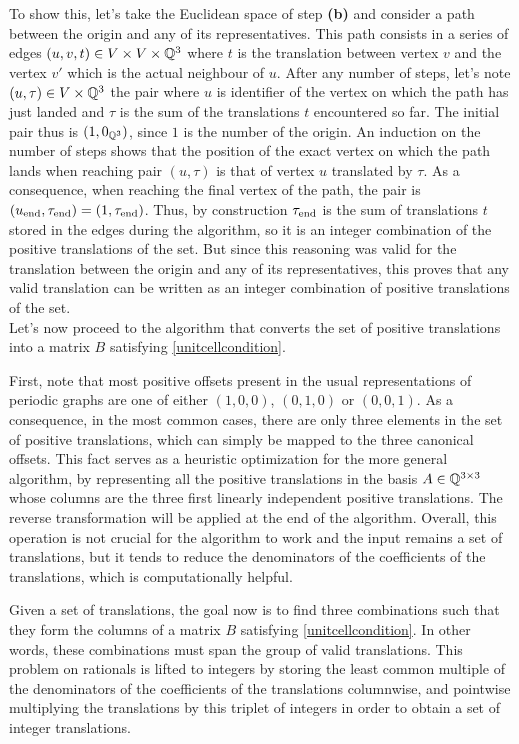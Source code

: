 \documentclass[main.tex]{subfiles}
\begin{document}
To show this, let's take the Euclidean space of step {\sffamily\small\bfseries(b)} and consider a path between the origin and any of its representatives. This path consists in a series of edges $(u,v,t)\in V\times V\times\mathbb{Q}^3$ where $t$ is the translation between vertex $v$ and the vertex $v'$ which is the actual neighbour of $u$. After any number of steps, let's note $(u,\tau)\in V\times\mathbb{Q}^3$ the pair where $u$ is identifier of the vertex on which the path has just landed and $\tau$ is the sum of the translations $t$ encountered so far. The initial pair thus is $(1,0_{\mathbb{Q}^3})$, since $1$ is the number of the origin. An induction on the number of steps shows that the position of the exact vertex on which the path lands when reaching pair $(u,\tau)$ is that of vertex $u$ translated by $\tau$. As a consequence, when reaching the final vertex of the path, the pair is $(u_\text{end},\tau_\text{end}) = (1,\tau_\text{end})$. Thus, by construction $\tau_\text{end}$ is the sum of translations $t$ stored in the edges during the algorithm, so it is an integer combination of the positive translations of the set. But since this reasoning was valid for the translation between the origin and any of its representatives, this proves that any valid translation can be written as an integer combination of positive translations of the set.\\

Let's now proceed to the algorithm that converts the set of positive translations into a matrix $B$ satisfying \cref{unitcellcondition}.

First, note that most positive offsets present in the usual representations of periodic graphs are one of either $(1,0,0)$, $(0,1,0)$ or $(0,0,1)$. As a consequence, in the most common cases, there are only three elements in the set of positive translations, which can simply be mapped to the three canonical offsets. This fact serves as a heuristic optimization for the more general algorithm, by representing all the positive translations in the basis $A\in\mathbb{Q}^{3\times3}$ whose columns are the three first linearly independent positive translations. The reverse transformation will be applied at the end of the algorithm. Overall, this operation is not crucial for the algorithm to work and the input remains a set of translations, but it tends to reduce the denominators of the coefficients of the translations, which is computationally helpful.

Given a set of translations, the goal now is to find three combinations such that they form the columns of a matrix $B$ satisfying \cref{unitcellcondition}. In other words, these combinations must span the group of valid translations. This problem on rationals is lifted to integers by storing the least common multiple of the denominators of the coefficients of the translations columnwise, and pointwise multiplying the translations by this triplet of integers in order to obtain a set of integer translations.
\end{document}
